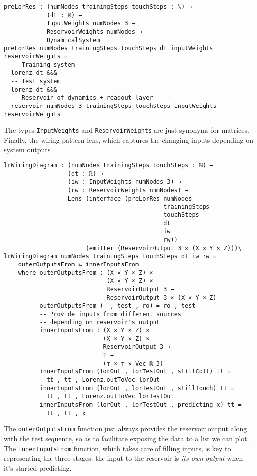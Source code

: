 \begin{verbatim}
preLorRes : (numNodes trainingSteps touchSteps : ℕ) → 
            (dt : ℝ) → 
            InputWeights numNodes 3 → 
            ReservoirWeights numNodes → 
            DynamicalSystem
preLorRes numNodes trainingSteps touchSteps dt inputWeights reservoirWeights = 
  -- Training system
  lorenz dt &&& 
  -- Test system
  lorenz dt &&&
  -- Reservoir of dynamics + readout layer
  reservoir numNodes 3 trainingSteps touchSteps inputWeights reservoirWeights
\end{verbatim}

The types \texttt{InputWeights} and \texttt{ReservoirWeights} are just synonyms for matrices. Finally, the wiring pattern lens, which captures the changing inputs depending on system outputs:

\begin{verbatim}
lrWiringDiagram : (numNodes trainingSteps touchSteps : ℕ) → 
                  (dt : ℝ) → 
                  (iw : InputWeights numNodes 3) → 
                  (rw : ReservoirWeights numNodes) → 
                  Lens (interface (preLorRes numNodes 
                                             trainingSteps 
                                             touchSteps 
                                             dt 
                                             iw 
                                             rw)) 
                       (emitter (ReservoirOutput 3 × (X × Y × Z)))\
lrWiringDiagram numNodes trainingSteps touchSteps dt iw rw = 
    outerOutputsFrom ⇆ innerInputsFrom
    where outerOutputsFrom : (X × Y × Z) × 
                             (X × Y × Z) × 
                             ReservoirOutput 3 → 
                             ReservoirOutput 3 × (X × Y × Z)
          outerOutputsFrom (_ , test , ro) = ro , test
          -- Provide inputs from different sources
          -- depending on reservoir's output
          innerInputsFrom : (X × Y × Z) × 
                            (X × Y × Z) × 
                            ReservoirOutput 3 → 
                            ⊤ → 
                            (⊤ × ⊤ × Vec ℝ 3)
          innerInputsFrom (lorOut , lorTestOut , stillColl) tt = 
            tt , tt , Lorenz.outToVec lorOut
          innerInputsFrom (lorOut , lorTestOut , stillTouch) tt =
            tt , tt , Lorenz.outToVec lorTestOut
          innerInputsFrom (lorOut , lorTestOut , predicting x) tt = 
            tt , tt , x
\end{verbatim}

The \texttt{outerOutputsFrom} function just always provides the reservoir output along with the test sequence, so as to facilitate exposing the data to a list we can plot. The \texttt{innerInputsFrom} function, which takes care of filling inputs, is key to representing the three stages: the input to the reservoir is \textit{its own output} when it's started predicting.


